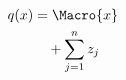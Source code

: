\begin{align*}
q(x) &= \Macro{x} %
\nonumber\\
&\quad + \sum_{j=1}^{n} z_j
\label{eq:macro-end}
\end{align*}
